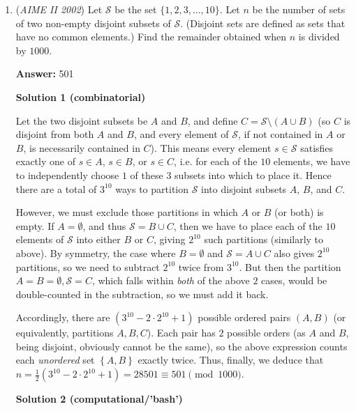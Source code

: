 \begin{enumerate}
 -maxamc

 


	\item (\textit{AIME II 2002}) Let $\mathcal{S}$ be the set $\lbrace1,2,3,\ldots,10\rbrace$. Let $n$ be the number of sets of two non-empty disjoint subsets of $\mathcal{S}$. (Disjoint sets are defined as sets that have no common elements.) Find the remainder obtained when $n$ is divided by $1000$.


 
 \textbf{Answer: }501



\textbf{Solution 1 (combinatorial)}

Let the two disjoint subsets be $A$ and $B$, and define $C = \mathcal{S}\setminus\left(A \cup B\right)$ (so $C$ is disjoint from both $A$ and $B$, and every element of $\mathcal{S}$, if not contained in $A$ or $B$, is necessarily contained in $C$). This means every element $s \in \mathcal{S}$ satisfies exactly one of $s \in A$, $s \in B$, or $s \in C$, i.e. for each of the $10$ elements, we have to independently choose $1$ of these $3$ subsets into which to place it. Hence there are a total of $3^{10}$ ways to partition $\mathcal{S}$ into disjoint subsets $A$, $B$, and $C$. 

 However, we must exclude those partitions in which $A$ or $B$ (or both) is empty. If $A = \emptyset$, and thus $\mathcal{S} = B \cup C$, then we have to place each of the $10$ elements of $\mathcal{S}$ into either $B$ or $C$, giving $2^{10}$ such partitions (similarly to above). By symmetry, the case where $B = \emptyset$ and $\mathcal{S} = A \cup C$ also gives $2^{10}$ partitions, so we need to subtract $2^{10}$ twice from $3^{10}$. But then the partition $A = B = \emptyset, \mathcal{S} = C$, which falls within \textit{both} of the above $2$ cases, would be double-counted in the subtraction, so we must add it back. 

 Accordingly, there are $\left(3^{10}-2\cdot2^{10}+1\right)$ possible ordered pairs $(A,B)$ (or equivalently, partitions $A,B,C$). Each pair has $2$ possible orders (as $A$ and $B$, being disjoint, obviously cannot be the same), so the above expression counts each \textit{unordered} set $\left\{A,B\right\}$ exactly twice. Thus, finally, we deduce that $n = \frac{1}{2}\left(3^{10}-2\cdot2^{10}+1\right) = 28501 \equiv \boxed{501} \pmod{1000}$.  

 



\textbf{Solution 2 (computational/'bash')}


\end{enumerate}
